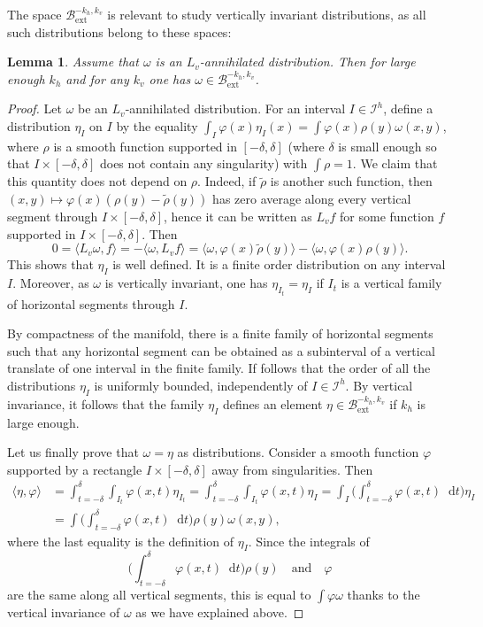 \documentclass[10pt]{amsart}
\newcommand{\ext}{\mathrm{ext}}
\newcommand{\boI}{\mathcal{I}}
\newcommand{\boB}{\mathcal{B}}
\newcommand{\dd}{\mathop{}\!\mathrm{d}}
\newcommand{\paregg}[1]{\biggl(#1\biggr)}
\let\phi\varphi
\newtheorem{lem}[thm]{Lemma}
\theoremstyle{definition}
\numberwithin{equation}{section}
\begin{document}
The space $\boB^{-k_h, k_v}_{\ext}$ is relevant to study vertically invariant
distributions, as all such distributions belong to these spaces:
\begin{lem}
\label{lem:all_Lvinv_in_boBext} Assume that $\omega$ is an $L_v$-annihilated
distribution. Then for large enough $k_h$ and for any $k_v$ one has $\omega
\in \boB^{-k_h, k_v}_{\ext}$.
\end{lem}
\begin{proof}
Let $\omega$ be an $L_v$-annihilated distribution. For an interval $I \in
\boI^h$, define a distribution $\eta_I$ on $I$ by the equality $\int_I
\phi(x) \eta_I(x) = \int \phi(x) \rho(y) \omega(x,y)$, where $\rho$ is a
smooth function supported in $[-\delta,\delta]$ (where $\delta$ is small
enough so that $I \times [-\delta, \delta]$ does not contain any singularity)
with $\int \rho = 1$. We claim that this quantity does not depend on $\rho$.
Indeed, if $\tilde \rho$ is another such function, then $(x,y)\mapsto \phi(x)
(\rho(y)-\tilde \rho(y))$ has zero average along every vertical segment
through $I \times [-\delta, \delta]$, hence it can be written as $L_v f$ for
some function $f$ supported in $I \times [-\delta,\delta]$. Then
\begin{equation*}
0 = \langle L_v \omega, f \rangle = - \langle \omega, L_v f \rangle
= \langle \omega, \phi(x)\tilde \rho(y) \rangle - \langle \omega, \phi(x) \rho(y) \rangle.
\end{equation*}
This shows that $\eta_I$ is well defined. It is a finite order distribution
on any interval $I$. Moreover, as $\omega$ is vertically invariant, one has
$\eta_{I_t} = \eta_I$ if $I_t$ is a vertical family of horizontal segments
through $I$.

By compactness of the manifold, there is a finite family of horizontal
segments such that any horizontal segment can be obtained as a subinterval of
a vertical translate of one interval in the finite family. If follows that
the order of all the distributions $\eta_I$ is uniformly bounded,
independently of $I \in \boI^h$. By vertical invariance, it follows that the
family $\eta_I$ defines an element $\eta \in \boB^{-k_h, k_v}_{\ext}$ if $k_h$
is large enough.

Let us finally prove that $\omega = \eta$ as distributions. Consider a smooth
function $\phi$ supported by a rectangle $I \times [-\delta, \delta]$ away
from singularities. Then
\begin{align*}
\langle \eta, \phi \rangle
&= \int_{t={-\delta}}^\delta \int_{I_t} \phi(x,t) \eta_{I_t}
= \int_{t={-\delta}}^\delta \int_{I_t} \phi(x,t) \eta_I
=\int_I \paregg{\int_{t={-\delta}}^\delta \phi(x,t) \dd t} \eta_I
\\&=\int \paregg{\int_{t={-\delta}}^\delta \phi(x,t) \dd t} \rho(y) \omega(x,y),
\end{align*}
where the last equality is the definition of $\eta_I$. Since the integrals of
\[
\paregg{\int_{t={-\delta}}^\delta \phi(x,t) \dd t} \rho(y)\quad\text{and}\quad \phi
\]
are
the same along all vertical segments, this is equal to $\int \phi \omega$
thanks to the vertical invariance of $\omega$ as we have explained above.


\end{proof}
\end{document}
